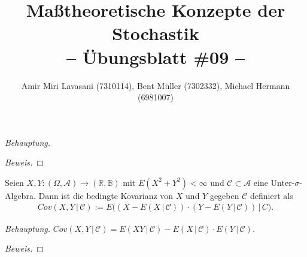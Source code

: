 \documentclass[10pt]{article}
\newcommand{\R}{\mathbb{R}}
\newcommand{\A}{\mathcal{A}}
\newcommand{\C}{\mathcal{C}}
\newcommand{\B}{\mathbb{B}}
\newcommand{\gap}{\,\vert\,}
\newcommand{\beh}{\textit{Behauptung. }}
\newenvironment{Aufgabe}[2][Aufgabe]{\begin{trivlist}
\item[\hskip \labelsep {\bfseries #1}\hskip \labelsep {\bfseries #2.}]}{\end{trivlist}}
\begin{document}
 
\title{ \textbf{Maßtheoretische Konzepte der Stochastik \\ -- Übungsblatt \#09 --} }

\author{Amir Miri Lavasani (7310114), Bent Müller (7302332),
        Michael Hermann (6981007)}
\maketitle

\begin{Aufgabe}{1} %
\end{Aufgabe}

\beh

\begin{proof}[Beweis]
	 
\end{proof}

\begin{Aufgabe}{2} %
	Seien $X,Y : (\Omega,\A)\to (\R,\B)$ mit $E(X^2+Y^2) < \infty$ und $\C\subset\A$ eine Unter-$\sigma$-Algebra. Dann 
	ist die bedingte Kovarianz von $X$ und $Y$ gegeben $\C$ definiert als
	\begin{align*}
		Cov(X,Y \gap \C) := E\big( (X-E(X\gap\C)) \cdot (Y-E(Y\gap\C)) \gap C \big).
	\end{align*}
\end{Aufgabe}

\beh $Cov(X,Y \gap \C) = E(XY \gap \C) - E(X \gap \C) \cdot E(Y \gap \C)$.

\begin{proof}[Beweis]  
\end{proof}
\end{document}
